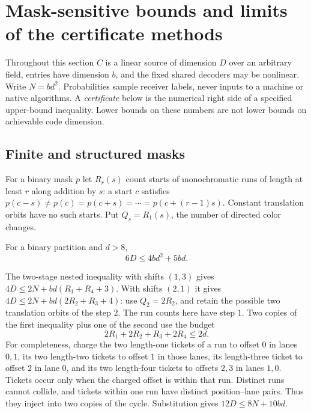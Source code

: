 \section{Mask-sensitive bounds and limits of the certificate methods}
\label{sec:mask-methods}

Throughout this section $C$ is a linear source of dimension $D$ over an
arbitrary field, entries have dimension $b$, and the fixed shared decoders
may be nonlinear. Write $N=bd^2$. Probabilities sample receiver labels,
never inputs to a machine or native algorithms. A \emph{certificate} below
is the numerical right side of a specified upper-bound inequality. Lower
bounds on these numbers are not lower bounds on achievable code dimension.

\subsection{Finite and structured masks}

For a binary mask $p$ let $R_r(s)$ count starts of monochromatic runs of
length at least $r$ along addition by $s$: a start $c$ satisfies
$p(c-s)\ne p(c)=p(c+s)=\cdots=p(c+(r-1)s)$. Constant translation orbits
have no such starts. Put $Q_s=R_1(s)$, the number of directed color changes.

\begin{proposition}\label{prop:finite-two-thirds}
For a binary partition and $d>8$,
\[
 6D\le4bd^2+5bd.
\]
\end{proposition}

\begin{outline}
The two-stage nested inequality with shifts $(1,3)$ gives
$4D\le2N+bd(R_1+R_4+3)$. With shifts $(2,1)$ it gives
$4D\le2N+bd(2R_2+R_3+4)$: use $Q_2=2R_2$, and retain the possible
two translation orbits of the step $2$. The run counts here have step $1$.
Two copies of the first inequality plus one of the second use the budget
\[
 2R_1+2R_2+R_3+2R_4\le2d.
\]
For completeness, charge the two length-one tickets of a run to offset
$0$ in lanes $0,1$, its two length-two tickets to offset $1$ in those
lanes, its length-three ticket to offset $2$ in lane $0$, and its two
length-four tickets to offsets $2,3$ in lanes $1,0$. Tickets occur only
when the charged offset is within that run. Distinct runs cannot collide,
and tickets within one run have distinct position--lane pairs. Thus they
inject into two copies of the cycle. Substitution gives
$12D\le8N+10bd$.
\end{outline}

